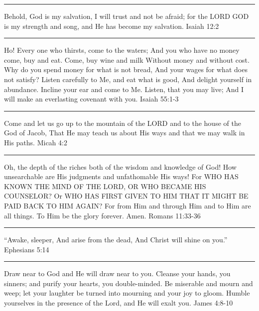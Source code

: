 \documentclass[]{book}
\begin{document}
\begin{center}\rule{0.5\linewidth}{\linethickness}\end{center}

Behold, God is my salvation, I will trust and not be afraid; for the
LORD GOD is my strength and song, and He has become my salvation.
\textbar{} Isaiah 12:2

\begin{center}\rule{0.5\linewidth}{\linethickness}\end{center}

Ho! Every one who thirsts, come to the waters; And you who have no money
come, buy and eat. Come, buy wine and milk Without money and without
cost. Why do you spend money for what is not bread, And your wages for
what does not satisfy? Listen carefully to Me, and eat what is good, And
delight yourself in abundance. Incline your ear and come to Me. Listen,
that you may live; And I will make an everlasting covenant with you.
\textbar{} Isaiah 55:1-3

\begin{center}\rule{0.5\linewidth}{\linethickness}\end{center}

Come and let us go up to the mountain of the LORD and to the house of
the God of Jacob, That He may teach us about His ways and that we may
walk in His paths. \textbar{} Micah 4:2

\begin{center}\rule{0.5\linewidth}{\linethickness}\end{center}

Oh, the depth of the riches both of the wisdom and knowledge of God! How
unsearchable are His judgments and unfathomable His ways! For WHO HAS
KNOWN THE MIND OF THE LORD, OR WHO BECAME HIS COUNSELOR? Or WHO HAS
FIRST GIVEN TO HIM THAT IT MIGHT BE PAID BACK TO HIM AGAIN? For from Him
and through Him and to Him are all things. To Him be the glory forever.
Amen. \textbar{} Romans 11:33-36

\begin{center}\rule{0.5\linewidth}{\linethickness}\end{center}

``Awake, sleeper, And arise from the dead, And Christ will shine on
you.'' \textbar{} Ephesians 5:14

\begin{center}\rule{0.5\linewidth}{\linethickness}\end{center}

Draw near to God and He will draw near to you. Cleanse your hands, you
sinners; and purify your hearts, you double-minded. Be miserable and
mourn and weep; let your laughter be turned into mourning and your joy
to gloom. Humble yourselves in the presence of the Lord, and He will
exalt you. \textbar{} James 4:8-10
\end{document}

